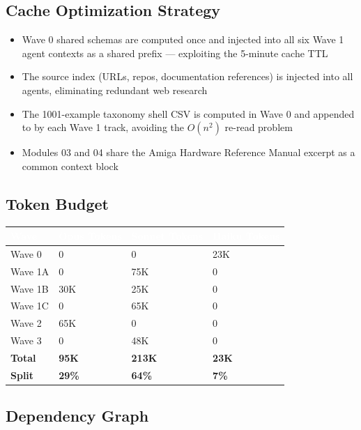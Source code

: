 \documentclass[11pt,letterpaper]{article}
\newcommand{\tableheader}[1]{\textbf{\sffamily\textcolor{white}{#1}}}
\begin{document}
\subsection{Cache Optimization Strategy}

\begin{itemize}[noitemsep]
  \item Wave 0 shared schemas are computed once and injected into all six Wave 1 agent contexts as a shared prefix — exploiting the 5-minute cache TTL
  \item The source index (URLs, repos, documentation references) is injected into all agents, eliminating redundant web research
  \item The 1001-example taxonomy shell CSV is computed in Wave 0 and appended to by each Wave 1 track, avoiding the $O(n^2)$ re-read problem
  \item Modules 03 and 04 share the Amiga Hardware Reference Manual excerpt as a common context block
\end{itemize}

\subsection{Token Budget}

\begin{center}
\begin{tabularx}{\textwidth}{L{3cm}C{2.5cm}C{2.5cm}C{2.5cm}}
\toprule
{}
\tableheader{Wave} & \tableheader{Opus Tokens} & \tableheader{Sonnet Tokens} & \tableheader{Haiku Tokens} \\
\midrule
Wave 0 & 0 & 0 & 23K \\
Wave 1A & 0 & 75K & 0 \\
Wave 1B & 30K & 25K & 0 \\
Wave 1C & 0 & 65K & 0 \\
Wave 2 & 65K & 0 & 0 \\
Wave 3 & 0 & 48K & 0 \\
\textbf{Total} & \textbf{95K} & \textbf{213K} & \textbf{23K} \\
\textbf{Split} & \textbf{29\%} & \textbf{64\%} & \textbf{7\%} \\
\bottomrule
\end{tabularx}
\end{center}

\subsection{Dependency Graph}
\end{document}
